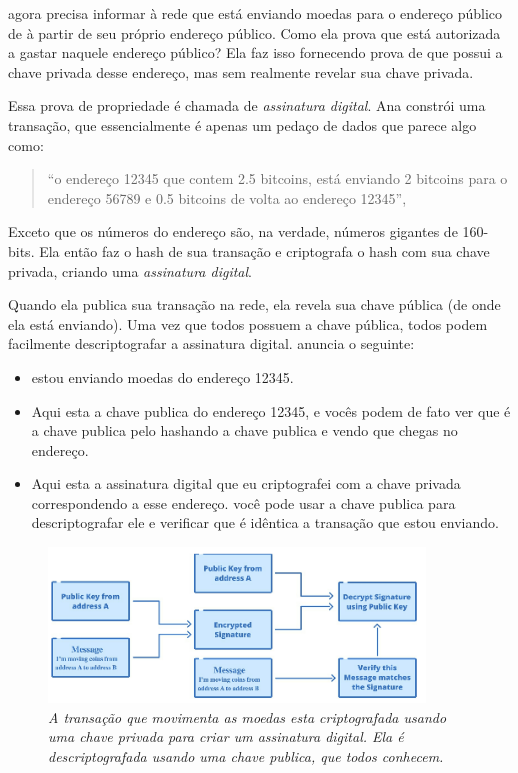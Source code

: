 \TraducaoNomeA agora precisa informar à rede que está enviando moedas para o endereço público de \TraducaoNomeB à partir de seu próprio endereço público. Como ela prova que está autorizada a gastar naquele endereço público? Ela faz isso fornecendo prova de que possui a chave privada desse endereço, mas sem realmente revelar sua chave privada.

Essa prova de propriedade é chamada de \textit{assinatura digital}. Ana constrói uma transação, que essencialmente é apenas um pedaço de dados que parece algo como:

\begin{quote}
    “o endereço 12345 que contem 2.5 bitcoins, está enviando 2 bitcoins para o endereço 56789 e 0.5 bitcoins de volta ao endereço 12345”, 
\end{quote}

Exceto que os números do endereço são, na verdade, números gigantes de 160-bits. Ela então faz o hash de sua transação e criptografa o hash com sua chave privada, criando uma \textit{assinatura digital}.

Quando ela publica sua transação na rede, ela revela sua chave pública (de onde ela está enviando). Uma vez que todos possuem a chave pública, todos podem facilmente descriptografar a assinatura digital. 
\TraducaoNomeA anuncia o seguinte:


\begin{itemize}
    \item  estou enviando moedas do endereço 12345.
    \item Aqui esta a chave publica do endereço 12345, e vocês podem de fato ver que é a chave publica pelo hashando a chave publica e vendo que chegas no endereço.
    \item Aqui esta a assinatura digital que eu criptografei com a chave privada correspondendo a esse endereço. você pode usar a chave publica para descriptografar ele e verificar que é idêntica a transação que estou enviando.
\end{itemize}

\begin{figure}
    \centering
    \includegraphics[width = 10cm]{imagens/capitulo7/Transação.png}
    \caption*{\textit{\small A transação que movimenta as moedas esta criptografada usando uma chave privada para criar um assinatura digital. Ela é descriptografada usando uma chave publica, que todos conhecem.}}
\end{figure}

